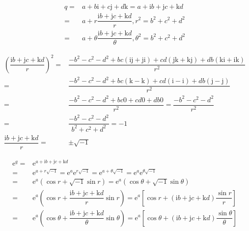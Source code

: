 \documentclass[
]{book}
\theoremstyle{definition}
\theoremstyle{definition}
\theoremstyle{definition}
\theoremstyle{definition}
\theoremstyle{remark}
\begin{document}
\[
\begin{aligned}
q= & a+b\mathrm{i}+c\mathrm{j}+d\mathrm{k}=a+\mathrm{i}b+\mathrm{j}c+\mathrm{k}d\\
= & a+r\dfrac{\mathrm{i}b+\mathrm{j}c+\mathrm{k}d}{r},r^{2}=b^{2}+c^{2}+d^{2}\\
= & a+\theta\dfrac{\mathrm{i}b+\mathrm{j}c+\mathrm{k}d}{\theta},\theta^{2}=b^{2}+c^{2}+d^{2}
\end{aligned}
\]

\[
\begin{aligned}
\left(\dfrac{\mathrm{i}b+\mathrm{j}c+\mathrm{k}d}{r}\right)^{2}= & \dfrac{-b^{2}-c^{2}-d^{2}+bc\left(\mathrm{i}\mathrm{j}+\mathrm{j}\mathrm{i}\right)+cd\left(\mathrm{j}\mathrm{k}+\mathrm{k}\mathrm{j}\right)+db\left(\mathrm{k}\mathrm{i}+\mathrm{i}\mathrm{k}\right)}{r^{2}}\\
= & \dfrac{-b^{2}-c^{2}-d^{2}+bc\left(\mathrm{k}-\mathrm{k}\right)+cd\left(\mathrm{i}-\mathrm{i}\right)+db\left(\mathrm{j}-\mathrm{j}\right)}{r^{2}}\\
= & \dfrac{-b^{2}-c^{2}-d^{2}+bc0+cd0+db0}{r^{2}}=\dfrac{-b^{2}-c^{2}-d^{2}}{r^{2}}\\
= & \dfrac{-b^{2}-c^{2}-d^{2}}{b^{2}+c^{2}+d^{2}}=-1\\
\dfrac{\mathrm{i}b+\mathrm{j}c+\mathrm{k}d}{r}= & \pm\sqrt{-1}
\end{aligned}
\]

\[
\begin{aligned}
\mathrm{e}^{q}= & \mathrm{e}^{a+\mathrm{i}b+\mathrm{j}c+\mathrm{k}d}\\
= & \mathrm{e}^{a+r\sqrt{-1}}=\mathrm{e}^{a}\mathrm{e}^{r\sqrt{-1}}=\mathrm{e}^{a+\theta\sqrt{-1}}=\mathrm{e}^{a}\mathrm{e}^{\theta\sqrt{-1}}\\
= & \mathrm{e}^{a}\left(\cos r+\sqrt{-1}\sin r\right)=\mathrm{e}^{a}\left(\cos\theta+\sqrt{-1}\sin\theta\right)\\
= & \mathrm{e}^{a}\left(\cos r+\dfrac{\mathrm{i}b+\mathrm{j}c+\mathrm{k}d}{r}\sin r\right)=\mathrm{e}^{a}\left[\cos r+\left(\mathrm{i}b+\mathrm{j}c+\mathrm{k}d\right)\dfrac{\sin r}{r}\right]\\
= & \mathrm{e}^{a}\left(\cos\theta+\dfrac{\mathrm{i}b+\mathrm{j}c+\mathrm{k}d}{\theta}\sin\theta\right)=\mathrm{e}^{a}\left[\cos\theta+\left(\mathrm{i}b+\mathrm{j}c+\mathrm{k}d\right)\dfrac{\sin\theta}{\theta}\right]
\end{aligned}
\]
\end{document}
